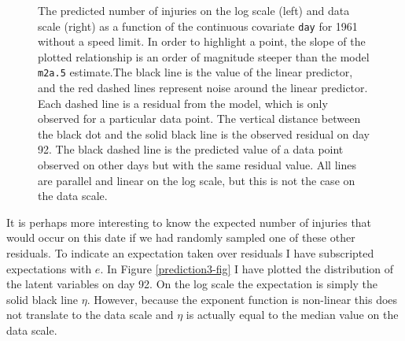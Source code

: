 \documentclass{article}
\begin{document}
\begin{figure}
\begin{minipage}[b]{0.5\linewidth}
\end{minipage}
\label{prediction1-fig}
\caption{The predicted number of injuries on the log scale (left) and data scale (right) as a function of the continuous covariate \texttt{day} for 1961 without a speed limit. In order to highlight a point, the slope of the plotted relationship is an order of magnitude steeper than the model \texttt{m2a.5} estimate.The black line is the value of the linear predictor, and the red dashed lines represent noise around the linear predictor. Each dashed line is a residual from the model, which is only observed for a particular data point. The vertical distance between the black dot and the solid black line is the observed residual on day 92. The black dashed line is the predicted value of a data point observed on other days but with the same residual value.  All lines are parallel and linear on the log scale, but this is not the case on the data scale.
}
\end{figure}


It is perhaps more interesting to know the expected number of injuries that would occur on this date if we had randomly sampled one of these other residuals. To indicate an expectation taken over residuals I have subscripted expectations with $e$.  In Figure \ref{prediction3-fig}  I have plotted the distribution of the latent variables on day 92. On the log scale the expectation is simply the solid black line $\eta$. However, because the exponent function is non-linear this does not translate to the data scale and $\eta$ is actually equal to the median value on the data scale.\\ 


\iftalk
\else
\fi

\iftalk
\else
\fi
\end{document}
